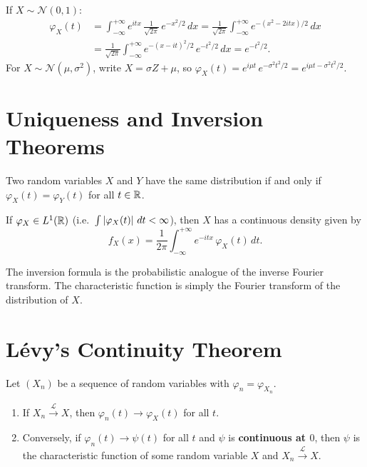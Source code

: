 \begin{example}
If $X \sim \mathcal{N}(0,1)$:
\begin{align*}
    \varphi_X(t) &= \int_{-\infty}^{+\infty} e^{itx}\,\frac{1}{\sqrt{2\pi}}\,e^{-x^2/2}\,dx
    = \frac{1}{\sqrt{2\pi}}\int_{-\infty}^{+\infty} e^{-(x^2-2itx)/2}\,dx \\
    &= \frac{1}{\sqrt{2\pi}}\int_{-\infty}^{+\infty}
    e^{-(x-it)^2/2}\,e^{-t^2/2}\,dx = e^{-t^2/2}.
\end{align*}
For $X \sim \mathcal{N}(\mu, \sigma^2)$, write $X = \sigma Z + \mu$, so
$\varphi_X(t) = e^{i\mu t}\,e^{-\sigma^2 t^2/2} = e^{i\mu t - \sigma^2 t^2/2}$.
\end{example}

\section{Uniqueness and Inversion Theorems}

\begin{theorem}
\label{thm:uniqueness}
Two random variables $X$ and $Y$ have the same distribution if and only if
$\varphi_X(t) = \varphi_Y(t)$ for all $t \in \mathbb{R}$.
\end{theorem}

\begin{theorem}
\label{thm:inversion}
If $\varphi_X \in L^1(\mathbb{R})$ (i.e.\ $\int\left| \varphi_X(t) \right|\,dt < \infty$),
then $X$ has a continuous density given by
\[
    f_X(x) = \frac{1}{2\pi}\int_{-\infty}^{+\infty} e^{-itx}\,\varphi_X(t)\,dt.
\]
\end{theorem}

\begin{remark}
The inversion formula is the probabilistic analogue of the inverse Fourier
transform. The characteristic function is simply the Fourier transform of the
distribution of $X$.
\end{remark}

\section{L\'evy's Continuity Theorem}

\begin{theorem}
\label{thm:levy}
Let $(X_n)$ be a sequence of random variables with $\varphi_n = \varphi_{X_n}$.
\begin{enumerate}[label=(\roman*)]
    \item If $X_n \xrightarrow{\mathcal{L}} X$, then $\varphi_n(t) \to \varphi_X(t)$
    for all $t$.
    \item Conversely, if $\varphi_n(t) \to \psi(t)$ for all $t$ and $\psi$ is
    \textbf{continuous at $0$}, then $\psi$ is the characteristic function of some
    random variable $X$ and $X_n \xrightarrow{\mathcal{L}} X$.
\end{enumerate}
\end{theorem}

